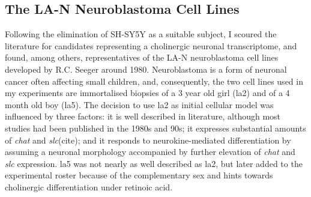 \subsection{The LA-N Neuroblastoma Cell Lines}
Following the elimination of SH-SY5Y as a suitable subject, I scoured the literature for candidates representing a cholinergic neuronal transcriptome, and found, among others, representatives of the LA-N neuroblastoma cell lines developed by R.C. Seeger around 1980.\cite{Seeger1977, Seeger1982} Neuroblastoma is a form of neuronal cancer often affecting small children, and, consequently, the two cell lines used in my experiments are immortalised biopsies of a 3 year old girl (\acs{la2}\cite{Seeger1977}) and of a 4 month old boy (\mbox{\acs{la5}}\cite{Seeger1982}). The decision to use \ac{la2} as initial cellular model was influenced by three factors: it is well described in literature, although most studies had been published in the 1980s and 90s; it expresses substantial amounts of \textit{\ac{chat}} and \textit{\ac{slc}}(cite); and it responds to neurokine-mediated differentiation by assuming a neuronal morphology accompanied by further elevation of \textit{\ac{chat}} and \textit{\ac{slc}} expression. \ac{la5} was not nearly as well described as \ac{la2}, but later added to the experimental roster because of the complementary sex and hints towards cholinergic differentiation under retinoic acid.\cite{Hill1997}

